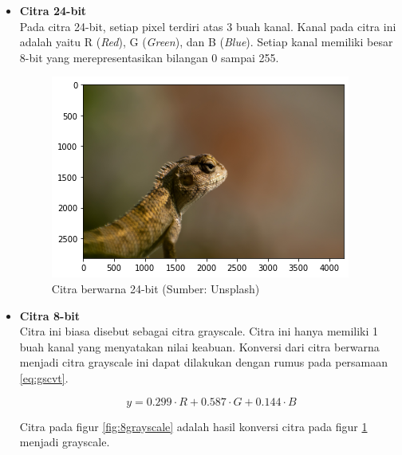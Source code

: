 \documentclass[10pt,conference]{IEEEtran}
\theoremstyle{definition}
\begin{document}
\begin{itemize}
    \item \textbf{Citra 24-bit}\\
    Pada citra 24-bit, setiap pixel terdiri atas 3 buah kanal. Kanal pada citra ini adalah yaitu R (\emph{Red}), G (\emph{Green}), dan B (\emph{Blue}).
    Setiap kanal memiliki besar 8-bit yang merepresentasikan bilangan 0 sampai 255.

\begin{figure}[htbp]
    \centerline{\includegraphics[width=0.9\columnwidth]{citra-original.png}}
    \caption{Citra berwarna 24-bit (Sumber: Unsplash)}
    \label{fig:24original}
\end{figure}

    \item \textbf{Citra 8-bit} \\
    Citra ini biasa disebut sebagai citra grayscale. Citra ini hanya memiliki 1 buah kanal yang menyatakan nilai keabuan. Konversi dari citra berwarna
    menjadi citra grayscale ini dapat dilakukan dengan rumus pada persamaan \ref{eq:gscvt}.

    \begin{equation} \label{eq:gscvt}
        y = 0.299 \cdot R + 0.587 \cdot G + 0.144 \cdot B
    \end{equation}

    Citra pada figur \ref{fig:8grayscale} adalah hasil konversi citra pada figur \ref{fig:24original} menjadi grayscale.


\end{itemize}
\end{document}

